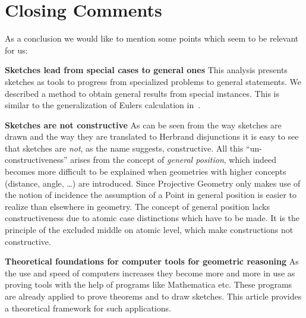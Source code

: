 %
%


\section{Closing Comments}
\label{sec:closing}

As a conclusion we would like to mention some points which seem to be
relevant for us:

\textbf{Sketches lead from special cases to general ones} 
This analysis presents sketches as tools to progress from specialized
problems to general statements. We described a method to obtain
general results from special instances. This is similar to the
generalization of Eulers calculation in~\cite{Baaz99THEC}.

\smallskip
\textbf{Sketches are not constructive} As can be seen from the way
sketches are drawn and the way they are translated to Herbrand
disjunctions it is easy to see that sketches are \emph{not}, as the
name suggests, constructive. All this ``un-constructiveness'' arises
from the concept of \emph{general position}, which indeed becomes more
difficult to be explained when geometries with higher concepts
(distance, angle, \ldots) are introduced. Since Projective Geometry
only makes use of the notion of 
incidence the assumption of a Point in general position is easier to
realize than elsewhere in geometry. The concept of general position
lacks constructiveness due to atomic case distinctions which have to
be made. It is the principle of the excluded middle on atomic level,
which make constructions not constructive.

\smallskip
\textbf{Theoretical foundations for computer tools for geometric
reasoning} As 
the use and speed of computers increases they become more and more
in use as proving tools with the help of programs like
Mathematica etc. These programs are already applied to prove
theorems and to draw sketches. This article provides a theoretical
framework for such applications. \citep{sketchpad,drgeo,mathematica}



\endinput

